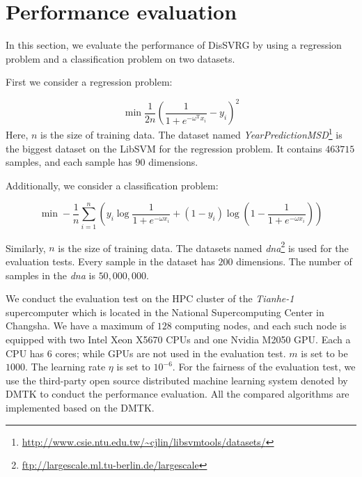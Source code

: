 \documentclass[preprint,review,11pt,a4paper]{elsarticle}
\begin{document}
\section{Performance evaluation}
\label{performance_evaluation}
In this section, we evaluate the performance of DisSVRG by using a regression problem and a classification problem on two datasets.

First we consider a regression problem:

\begin{equation}
\label{regression}
\min \frac{1}{2n}\left(\frac{1}{1+e^{-\omega^\mathrm{T}x_i}}-y_i\right)^2
\end{equation}
Here, $n$ is the size of training data. The dataset named \emph{YearPredictionMSD}\footnote{\url{http://www.csie.ntu.edu.tw/~cjlin/libsvmtools/datasets/}} is the biggest dataset on the LibSVM for the regression problem. It contains $463715$ samples, and each sample has $90$ dimensions.

Additionally, we consider a classification problem:

\begin{equation}
\label{classification}
\min -\frac{1}{n}\sum\limits_{i=1}^n\left(y_i\log\frac{1}{1+e^{-\omega x_i}}+(1-y_i)\log(1-\frac{1}{1+e^{-\omega x_i}})\right)
\end{equation}

Similarly, $n$ is the size of training data. The datasets named \emph{dna}\footnote{\url{ftp://largescale.ml.tu-berlin.de/largescale}} is used for the evaluation tests. Every sample in the dataset has $200$ dimensions.  The number of samples in the \emph{dna} is $50,000,000$.

We conduct the evaluation test on the HPC cluster of the \emph{Tianhe-1} supercomputer which is located in the National Supercomputing Center in Changsha. We have a maximum of $128$ computing nodes, and each such node is equipped with two Intel Xeon X5670 CPUs  and  one Nvidia M2050 GPU. Each a CPU has $6$ cores; while GPUs are not used in the evaluation test. $m$  is set to be $1000$. The learning rate $\eta$ is set to $10^{-6}$. For the fairness of the evaluation test, we use the third-party open source distributed machine learning system denoted by DMTK \cite{Yuan:2015ka} to conduct the performance evaluation. All the compared algorithms are implemented based on the DMTK.
\end{document}
